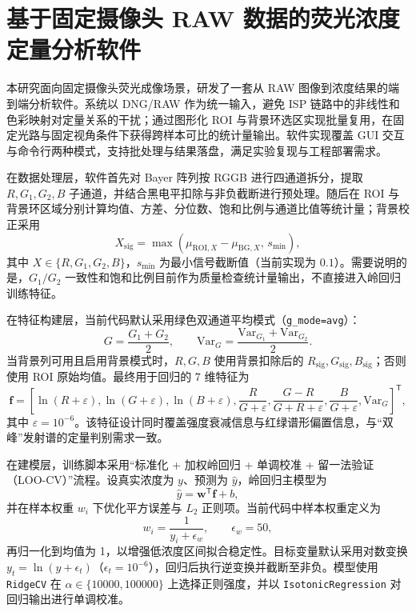 ﻿\documentclass[12pt,a4paper]{ctexart}
\begin{document}
\section*{基于固定摄像头 RAW 数据的荧光浓度定量分析软件}

本研究面向固定摄像头荧光成像场景，研发了一套从 RAW 图像到浓度结果的端到端分析软件。系统以 DNG/RAW 作为统一输入，避免 ISP 链路中的非线性和色彩映射对定量关系的干扰；通过图形化 ROI 与背景环选区实现批量复用，在固定光路与固定视角条件下获得跨样本可比的统计量输出。软件实现覆盖 GUI 交互与命令行两种模式，支持批处理与结果落盘，满足实验复现与工程部署需求\cite{ruiz2023,branning2024}。

在数据处理层，软件首先对 Bayer 阵列按 RGGB 进行四通道拆分，提取 $R,G_1,G_2,B$ 子通道，并结合黑电平扣除与非负截断进行预处理。随后在 ROI 与背景环区域分别计算均值、方差、分位数、饱和比例与通道比值等统计量；背景校正采用
\begin{equation}
X_{\mathrm{sig}}=\max\!\left(\mu_{\mathrm{ROI},X}-\mu_{\mathrm{BG},X},\,s_{\min}\right),
\end{equation}
其中 $X\in\{R,G_1,G_2,B\}$，$s_{\min}$ 为最小信号截断值（当前实现为 $0.1$）。需要说明的是，$G_1/G_2$ 一致性和饱和比例目前作为质量检查统计量输出，不直接进入岭回归训练特征。

在特征构建层，当前代码默认采用绿色双通道平均模式（\texttt{g\_mode=avg}）：
\begin{equation}
G=\frac{G_1+G_2}{2},\qquad
\mathrm{Var}_G=\frac{\mathrm{Var}_{G_1}+\mathrm{Var}_{G_2}}{2}.
\end{equation}
当背景列可用且启用背景模式时，$R,G,B$ 使用背景扣除后的 $R_{\mathrm{sig}},G_{\mathrm{sig}},B_{\mathrm{sig}}$；否则使用 ROI 原始均值。最终用于回归的 7 维特征为
\begin{equation}
\bm{f}=
\left[
\ln(R+\varepsilon),
\ln(G+\varepsilon),
\ln(B+\varepsilon),
\frac{R}{G+\varepsilon},
\frac{G-R}{G+R+\varepsilon},
\frac{B}{G+\varepsilon},
\mathrm{Var}_G
\right]^{\mathsf T},
\end{equation}
其中 $\varepsilon=10^{-6}$。该特征设计同时覆盖强度衰减信息与红绿谱形偏置信息，与“双峰”发射谱的定量判别需求一致\cite{liu2021,rasooly2016}。

在建模层，训练脚本采用“标准化 + 加权岭回归 + 单调校准 + 留一法验证（LOO-CV）”流程。设真实浓度为 $y$、预测为 $\hat{y}$，岭回归主模型为
\begin{equation}
\hat{y}=\bm{w}^{\mathsf T}\bm{f}+b,
\end{equation}
并在样本权重 $w_i$ 下优化平方误差与 $L_2$ 正则项。当前代码中样本权重定义为
\begin{equation}
w_i=\frac{1}{y_i+\epsilon_w},\qquad \epsilon_w=50,
\end{equation}
再归一化到均值为 1，以增强低浓度区间拟合稳定性。目标变量默认采用对数变换 $y_t=\ln(y+\epsilon_t)$（$\epsilon_t=10^{-6}$），回归后执行逆变换并截断至非负。模型使用 \texttt{RidgeCV} 在 $\alpha\in\{10000,100000\}$ 上选择正则强度，并以 \texttt{IsotonicRegression} 对回归输出进行单调校准\cite{hasinoff2016}。
\end{document}
